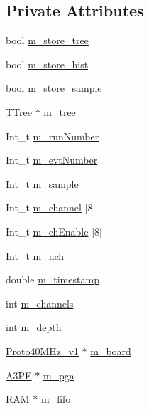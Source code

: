 \subsection*{Private Attributes}
\begin{DoxyCompactItemize}
\item 
bool \hyperlink{classAcquisition_aca2143e9135e25554e58327475a767c5}{m\+\_\+store\+\_\+tree}
\item 
bool \hyperlink{classAcquisition_a08f70edd83751dbdab4c8190dc4b9188}{m\+\_\+store\+\_\+hist}
\item 
bool \hyperlink{classAcquisition_a987cc1d04007cf1f5acc1accfd0909e5}{m\+\_\+store\+\_\+sample}
\item 
T\+Tree $\ast$ \hyperlink{classAcquisition_aa88a923232e8b7e08f5c1b5411497fc5}{m\+\_\+tree}
\item 
Int\+\_\+t \hyperlink{classAcquisition_afd35e220e0bfda7e763584524273aeb0}{m\+\_\+run\+Number}
\item 
Int\+\_\+t \hyperlink{classAcquisition_a32a70daa3f653eae5eafc46dbd0e11a6}{m\+\_\+evt\+Number}
\item 
Int\+\_\+t \hyperlink{classAcquisition_a154e5423720ab1f2c4ab5cd125cb4e80}{m\+\_\+sample}
\item 
Int\+\_\+t \hyperlink{classAcquisition_a9233a189179591c0c2f2639a3e6c13f6}{m\+\_\+channel} \mbox{[}8\mbox{]}
\item 
Int\+\_\+t \hyperlink{classAcquisition_a217269bc403d9fd271a1701c98afb30e}{m\+\_\+ch\+Enable} \mbox{[}8\mbox{]}
\item 
Int\+\_\+t \hyperlink{classAcquisition_a1860c7a03a65ea7a778d30dd4a40e1e1}{m\+\_\+nch}
\item 
double \hyperlink{classAcquisition_aa88cf8d27e075b5aaddb309dfb42cd04}{m\+\_\+timestamp}
\item 
int \hyperlink{classAcquisition_aedc8b29f322ef00540797fbd0d5112d1}{m\+\_\+channels}
\item 
int \hyperlink{classAcquisition_a26628424533a2dd74d24712a14637a72}{m\+\_\+depth}
\item 
\hyperlink{classProto40MHz__v1}{Proto40\+M\+Hz\+\_\+v1} $\ast$ \hyperlink{classAcquisition_a9b0db99be79d61ae78dae8a9e4efceab}{m\+\_\+board}
\item 
\hyperlink{classA3PE}{A3\+PE} $\ast$ \hyperlink{classAcquisition_aac113fd42c6574cdb4154e9808a21b67}{m\+\_\+pga}
\item 
\hyperlink{classRAM}{R\+AM} $\ast$ \hyperlink{classAcquisition_a8a893e7485e96da01185df6d1109c0bc}{m\+\_\+fifo}
\item 

\end{DoxyCompactItemize}
